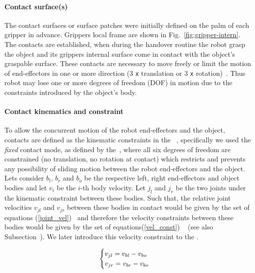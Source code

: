 \paragraph*{Contact surface(s)} 
The contact surfaces or surface patches were initially defined on the palm of each gripper in advance. Grippers local frame are shown in Fig.~\ref{fig:gripper-intern}. The contacts are established, when during the handover routine the robot grasp the object and its grippers internal surface come in contact with the object's graspable surface. These contacts are necessary to move freely or limit the motion of end-effectors in one or more direction (3 \texttt{x} translation or 3 \texttt{x} rotation)~\cite{bouyarmane2018multi}. Thus robot may lose one or more degrees of freedom (DOF) in motion due to the constraints introduced by the object's body.


\paragraph*{Contact kinematics and constraint}
To allow the concurrent motion of the robot end-effectors and the object, contacts are defined as the kinematic constraints in the ~, specifically we used the \textit{fixed} contact mode, as defined by the~\cite{balkcom2002computing}, where all six degrees of freedom are constrained (no translation, no rotation at contact) which restricts and prevents any possibility of sliding motion between the robot end-effectors and the object. Lets consider $b_{l}$, $b_{r}$ and $b_o$ be the respective left, right end-effectors and object bodies and let $v_i$ be the $i$-th body velocity. Let $j_l$ and $j_r$ be the two joints under the kinematic constraint between these bodies. Such that, the relative joint velocities $v_{jl}$ and $v_{jr}$ between these bodies in contact would be given by the set of equations (\ref{joint_vel})~\cite{Featherstone:1987} and therefore the velocity constraints between these bodies would be given by the set of equations(\ref{vel_const}) ~\cite{ohwovoriole1980externsion} (see also Subsection~). We later introduce this velocity constraint to the .

\begin{equation}\label{joint_vel}
\centering
\begin{cases}
v_{jl} = v_{bl} - v_{bo} \\
v_{jr} = v_{br} - v_{bo} \\
\end{cases}
\end{equation}


